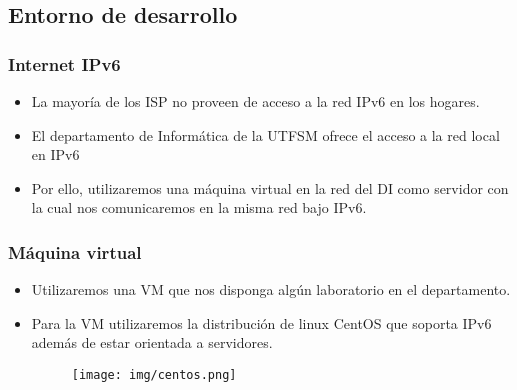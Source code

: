 \documentclass{beamer}
\begin{document}


\subsection{Entorno de desarrollo}

\begin{frame}
  \frametitle{Internet IPv6}
  \begin{itemize}[itemsep=3em]
  \item
	  La mayoría de los ISP no proveen de acceso a la red IPv6 en
	  los hogares.
  \item
	  El departamento de Informática de la UTFSM ofrece el acceso
	  a la red local en IPv6
  \item
	  Por ello, utilizaremos una máquina virtual en la red del DI
	  como servidor con la cual nos comunicaremos en la misma
	  red bajo IPv6.
  \end{itemize}
\end{frame}

\begin{frame}
  \frametitle{Máquina virtual}
  \begin{itemize}[itemsep=3em]
  \item
	  Utilizaremos una VM que nos disponga algún laboratorio
	  en el departamento.
  \item
	  Para la VM utilizaremos la distribución de linux CentOS
	  que soporta IPv6 además de estar orientada a servidores.
	\begin{figure}
		\centering
		\texttt{[image: img/centos.png]}
	\end{figure}
  \end{itemize}
\end{frame}


  
\end{document}
